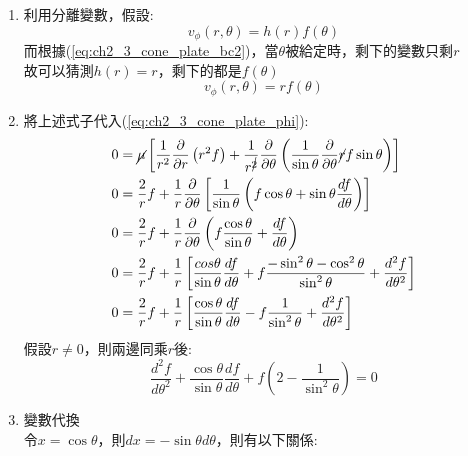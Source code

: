 \documentclass[../main.tex]{subfiles}
\begin{document}
\begin{itemize}
\begin{enumerate}
\begin{align}
      \tau_{r\phi} (R,\theta) &= 0  \label{eq:ch2_3_cone_plate_bc4}
    \end{align}
    \item 利用分離變數，假設:
    \begin{equation}
      v_\phi (r,\theta) = h(r) f(\theta)
    \end{equation}
    而根據(\ref{eq:ch2_3_cone_plate_bc2})，當$\theta$被給定時，剩下的變數只剩$r$\\
    故可以猜測$h(r) = r$，剩下的都是$f(\theta)$
    \begin{equation}
      v_\phi (r,\theta) = r f(\theta)
    \end{equation}
    \item 將上述式子代入(\ref{eq:ch2_3_cone_plate_phi}):
    \begin{align}
      0 &= \cancel{\mu} \left[
        \frac{1}{r^2}\frac{\partial}{\partial r}\left(r^2f\right)+\frac{1}{r^{\cancel{2}}}\frac{\partial}{\partial \theta}
        \left(\frac{1}{\sin\theta}\frac{\partial}{\partial \theta}\cancel{r}f\sin\theta\right)
        \right] \nonumber\\
      0 &= \frac{2}{r}f + \frac{1}{r}\frac{\partial}{\partial \theta}\left[
        \frac{1}{\sin\theta}\left(
          f\cos\theta + \sin\theta \frac{d f}{d \theta}
        \right)
      \right] \nonumber\\
      0 &= \frac{2}{r}f + \frac{1}{r}\frac{\partial }{\partial \theta}\left(
        f\frac{\cos\theta}{\sin\theta} + \frac{d f}{d \theta}\right) \nonumber\\
      0 &= \frac{2}{r}f + \frac{1}{r}\left[
        \frac{cos\theta}{\sin\theta}\frac{d f}{d \theta} + f\frac{-\sin^2\theta - \cos^2\theta}{\sin^2\theta}
         + \frac{d^2 f}{d \theta^2}
      \right] \nonumber\\
      0 &= \frac{2}{r}f + \frac{1}{r}\left[
        \frac{\cos\theta}{\sin\theta}\frac{d f}{d \theta} - f\frac{1}{\sin^2\theta}
         + \frac{d^2 f}{d \theta^2}
      \right]
    \end{align}
    假設$r\neq 0$，則兩邊同乘$r$後:
    \begin{equation}
      \boxed{\frac{d^2 f}{d \theta^2} + \frac{\cos\theta}{\sin\theta}\frac{d f}{d \theta}
        + f\left(2 - \frac{1}{\sin^2\theta}\right) = 0} \label{eq:ch2_3_cone_plate_ode}
    \end{equation}
    \item 變數代換\\
    令$x = \cos\theta$，則$dx = -\sin\theta d\theta$，則有以下關係:
    \begin{equation}

\end{equation}
\end{enumerate}
\end{itemize}
\end{document}
